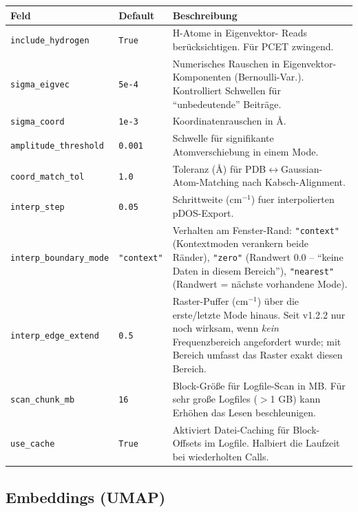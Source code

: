 \documentclass[11pt,a4paper,twoside]{article}
\theoremstyle{remark}
\begin{document}
\begin{longtable}{p{} p{} p{}}
\toprule
\textbf{Feld} & \textbf{Default} & \textbf{Beschreibung} \\
\midrule
\endhead
\texttt{include\_hydrogen} & \texttt{True} & H-Atome in Eigenvektor-
  Reads ber\"ucksichtigen. F\"ur PCET zwingend. \\
\texttt{sigma\_eigvec}    & \texttt{5e-4}  & Numerisches Rauschen
  in Eigenvektor-Komponenten (Bernoulli-Var.). Kontrolliert Schwellen
  f\"ur ``unbedeutende'' Beitr\"age. \\
\texttt{sigma\_coord}     & \texttt{1e-3} & Koordinatenrauschen
  in \AA{}. \\
\texttt{amplitude\_threshold} & \texttt{0.001} & Schwelle f\"ur
  signifikante Atomverschiebung in einem Mode. \\
\texttt{coord\_match\_tol} & \texttt{1.0}   & Toleranz (\AA{}) f\"ur
  PDB$\leftrightarrow$Gaussian-Atom-Matching nach Kabsch-Alignment. \\
\texttt{interp\_step}     & \texttt{0.05}  & Schrittweite (cm$^{-1}$)
  fuer interpolierten pDOS-Export. \\
\texttt{interp\_boundary\_mode} & \texttt{"context"} & Verhalten am
  Fenster-Rand: \texttt{"context"} (Kontextmoden verankern beide
  R\"ander), \texttt{"zero"} (Randwert $0.0$ -- ``keine Daten in diesem
  Bereich''), \texttt{"nearest"} (Randwert = n\"achste vorhandene
  Mode). \\
\texttt{interp\_edge\_extend} & \texttt{0.5} & Raster-Puffer (cm$^{-1}$)
  \"uber die erste/letzte Mode hinaus. Seit v1.2.2 nur noch wirksam, wenn
  \emph{kein} Frequenzbereich angefordert wurde; mit Bereich umfasst das
  Raster exakt diesen Bereich. \\
\texttt{scan\_chunk\_mb}  & \texttt{16}    & Block-Gr\"o\ss e f\"ur
  Logfile-Scan in MB. F\"ur sehr gro\ss e Logfiles ($>$1 GB) kann
  Erh\"ohen das Lesen beschleunigen. \\
\texttt{use\_cache}       & \texttt{True}  & Aktiviert Datei-Caching f\"ur
  Block-Offsets im Logfile. Halbiert die Laufzeit bei wiederholten Calls. \\
\bottomrule
\end{longtable}

\subsection{Embeddings (UMAP)}
\end{document}
